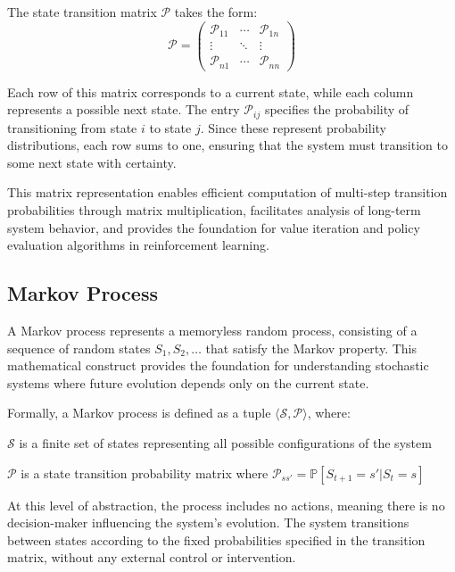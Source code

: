 The state transition matrix $\mathcal{P}$ takes the form:
\begin{equation}
\mathcal{P} = \begin{pmatrix}
\mathcal{P}_{11} & \cdots & \mathcal{P}_{1n} \\
\vdots & \ddots & \vdots \\
\mathcal{P}_{n1} & \cdots & \mathcal{P}_{nn}
\end{pmatrix}
\end{equation}

Each row of this matrix corresponds to a current state, while each column represents a possible next state. The entry $\mathcal{P}_{ij}$ specifies the probability of transitioning from state $i$ to state $j$. Since these represent probability distributions, each row sums to one, ensuring that the system must transition to some next state with certainty.

This matrix representation enables efficient computation of multi-step transition probabilities through matrix multiplication, facilitates analysis of long-term system behavior, and provides the foundation for value iteration and policy evaluation algorithms in reinforcement learning.


\subsection{Markov Process}


A Markov process represents a memoryless random process, consisting of a sequence of random states $S_1, S_2, \ldots$ that satisfy the Markov property. This mathematical construct provides the foundation for understanding stochastic systems where future evolution depends only on the current state.

Formally, a Markov process is defined as a tuple $\langle \mathcal{S}, \mathcal{P} \rangle$, where:
\begin{compactitemize}
\item $\mathcal{S}$ is a finite set of states representing all possible configurations of the system
\item $\mathcal{P}$ is a state transition probability matrix where $\mathcal{P}_{ss'} = \mathbb{P}[S_{t+1} = s' | S_t = s]$
\end{compactitemize}

At this level of abstraction, the process includes no actions, meaning there is no decision-maker influencing the system's evolution. The system transitions between states according to the fixed probabilities specified in the transition matrix, without any external control or intervention.

